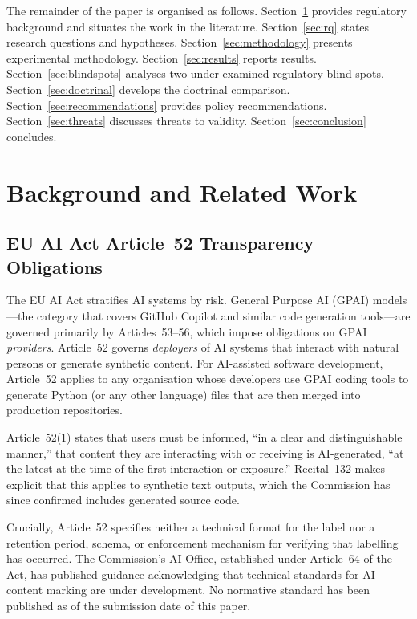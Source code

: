 \documentclass[conference]{IEEEtran}
\begin{document}
The remainder of the paper is organised as follows.
Section~\ref{sec:background} provides regulatory background and situates
the work in the literature.  Section~\ref{sec:rq} states research
questions and hypotheses.  Section~\ref{sec:methodology} presents
experimental methodology.  Section~\ref{sec:results} reports results.
Section~\ref{sec:blindspots} analyses two under-examined regulatory
blind spots.  Section~\ref{sec:doctrinal} develops the doctrinal
comparison.  Section~\ref{sec:recommendations} provides policy
recommendations.  Section~\ref{sec:threats} discusses threats to
validity.  Section~\ref{sec:conclusion} concludes.

\section{Background and Related Work}
\label{sec:background}

\subsection{EU AI Act Article~52 Transparency Obligations}

The EU AI Act stratifies AI systems by risk.  General Purpose AI (GPAI)
models---the category that covers GitHub Copilot and similar code
generation tools---are governed primarily by Articles~53--56, which
impose obligations on GPAI \emph{providers}.  Article~52 governs
\emph{deployers} of AI systems that interact with natural persons or
generate synthetic content.  For AI-assisted software development,
Article~52 applies to any organisation whose developers use GPAI coding
tools to generate Python (or any other language) files that are then
merged into production repositories.

Article~52(1) states that users must be informed, ``in a clear and
distinguishable manner,'' that content they are interacting with or
receiving is AI-generated, ``at the latest at the time of the first
interaction or exposure.''  Recital~132 makes explicit that this applies
to synthetic text outputs, which the Commission has since confirmed
includes generated source code.

Crucially, Article~52 specifies neither a technical format for the label
nor a retention period, schema, or enforcement mechanism for verifying
that labelling has occurred.  The Commission's AI Office, established
under Article~64 of the Act, has published guidance acknowledging that
technical standards for AI content marking are under development.  No
normative standard has been published as of the submission date of this
paper.
\end{document}
